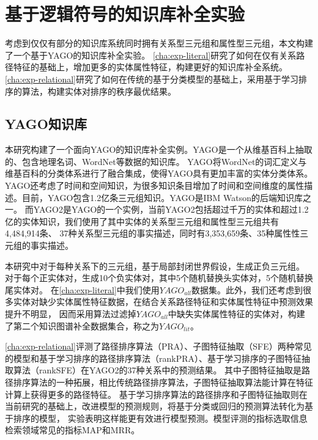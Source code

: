 
\chapter{基于逻辑符号的知识库补全实验}
\label{cha:kbc-exp}
考虑到仅仅有部分的知识库系统同时拥有关系型三元组和属性型三元组，本文构建了一个基于YAGO的知识库补全实验。
\ref{cha:exp-literal}研究了如何在仅有关系路径特征的基础上，增加更多的实体属性特征，构建更好的知识库补全系统。
\ref{cha:exp-relational}研究了如何在传统的基于分类模型的基础上，采用基于学习排序的算法，构建实体对排序的秩序最优结果。


\section{YAGO知识库}
本研究构建了一个面向YAGO的知识库补全实例。YAGO是一个从维基百科上抽取的、包含地理名词、WordNet\cite{Kasneci2008TheYA}等数据的知识库。
YAGO将WordNet的词汇定义与维基百科的分类体系进行了融合集成\cite{Suchanek2008YAGOAL}，使得YAGO具有更加丰富的实体分类体系。YAGO还考虑了时间和空间知识，为很多知识条目增加了时间和空间维度的属性描述。目前，YAGO包含1.2亿条三元组知识。YAGO是IBM Watson\cite{Ferrucci2010BuildingWA}的后端知识库之一。
而YAGO2是YAGO的一个实例，当前YAGO2包括超过千万的实体和超过1.2亿的实体知识，我们使用了其中实体的关系型三元组和属性型三元组共有4,484,914条、
37种关系型三元组的事实描述，同时有3,353,659条、35种属性性三元组的事实描述。

本研究中对于每种关系下的三元组，基于局部封闭世界假设，生成正负三元组。
对于每个正实体对，生成10个负实体对，其中5个随机替换头实体对，5个随机替换尾实体对。
在\ref{cha:exp-literal}中我们使用$YAGO_{all}$数据集。此外，我们还考虑到很多实体对缺少实体属性特征数据，在结合关系路径特征和实体属性特征中预测效果提升不明显，
因而采用算法过滤掉$YAGO_{all}$中缺失实体属性特征的实体对，构建了第二个知识图谱补全数据集合，称之为$YAGO_{lit}$。

\ref{cha:exp-relational}评测了路径排序算法（PRA）、子图特征抽取（SFE）两种常见的模型和基于学习排序的路径排序算法（rankPRA）、基于学习排序的子图特征抽取算法（rankSFE）在YAGO2的37种关系中的预测结果。
其中子图特征抽取是路径排序算法的一种拓展，相比传统路径排序算法，子图特征抽取算法能计算在特征计算上获得更多的路径特征。
基于学习排序算法的路径排序和子图特征抽取则在当前研究的基础上，改进模型的预测规则，将基于分类或回归的预测算法转化为基于排序的模型，
实验表明这样能更有效进行模型预测。模型评测的指标选取信息检索领域常见的指标MAP和MRR。

